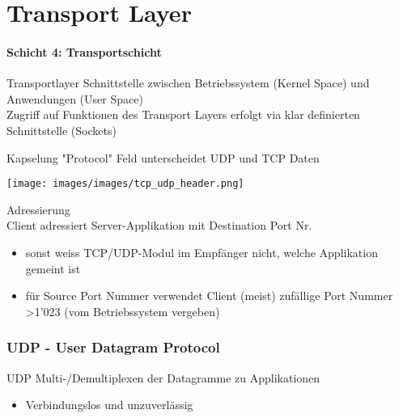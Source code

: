 \section{Transport Layer}
\paragraph{Schicht 4: Transportschicht}


\begin{definition}{Transportlayer}
    Schnittstelle zwischen Betriebssystem (Kernel Space) und Anwendungen (User Space)\\
    Zugriff auf Funktionen des Transport Layers erfolgt via klar definierten Schnittstelle (Sockets)
\end{definition}

\begin{definition}{Kapselung} "Protocol" Feld unterscheidet UDP und TCP Daten
    
    \texttt{[image: images/images/tcp\_udp\_header.png]}
\end{definition}

\begin{concept}{Adressierung}\\
    Client adressiert Server-Applikation mit Destination Port Nr.
    \begin{itemize}
        \item sonst weiss TCP/UDP-Modul im Empfänger nicht, welche Applikation gemeint ist
        \item für Source Port Nummer verwendet Client (meist) zufällige Port Nummer >1'023 (vom Betriebssystem vergeben)
    \end{itemize}
\end{concept}

\subsubsection{UDP - User Datagram Protocol}

\begin{definition}{UDP}
    Multi-/Demultiplexen der Datagramme zu Applikationen
    \begin{itemize}
        \item Verbindungslos und unzuverlässig
    \end{itemize}
\end{definition}

